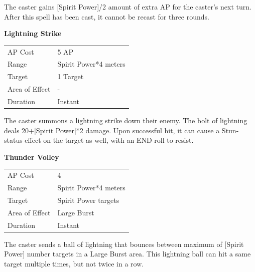 \documentclass[11pt,a4paper,twocolumn]{book}
\begin{document}
The caster gains [Spirit Power]/2 amount of extra AP for the caster's next turn. After this spell has been cast, it cannot be recast for three rounds. 

\bigskip
\noindent
\textbf{Lightning Strike}

\smallskip
{
	\begin{tabu} to 70mm{| X[l,4] | X[l,7] |}
		\hline
        AP Cost	      	& 5 AP 						\\
        Range     		& Spirit Power*4 meters				\\
        Target      	& 1 Target		\\
        Area of Effect  & -  	 			\\
        Duration     	& Instant		\\ \hline
	\end{tabu}
		
}
\smallskip

The caster summons a lightning strike down their enemy. The bolt of lightning deals 20+[Spirit Power]*2 damage. Upon successful hit, it can cause a Stun- status effect on the target as well, with an END-roll to resist.

\bigskip
\noindent
\textbf{Thunder Volley}

\smallskip
{
	\begin{tabu} to 70mm{| X[l,4] | X[l,7] |}
		\hline
        AP Cost	      	& 4 						\\
        Range     		& Spirit Power*4 meters		\\
        Target      	& Spirit Power targets		\\
        Area of Effect  & Large Burst  	 			\\
        Duration     	& Instant		\\ \hline
	\end{tabu}
		
}
\smallskip

The caster sends a ball of lightning that bounces between maximum of [Spirit Power] number targets in a Large Burst area. This lightning ball can hit a same target multiple times, but not twice in a row. 

\bigskip
\end{document}
